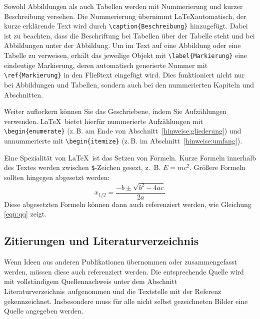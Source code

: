 \documentclass[final,bibliography=totocnumbered]{include/sikseminar}
\begin{document}
Sowohl Abbildungen als auch Tabellen werden mit Nummerierung und kurzer Beschreibung versehen. Die Nummerierung übernimmt \LaTeX automatisch, der kurze erklärende Text wird durch \verb+\caption{Beschreibung}+ hinzugefügt. Dabei ist zu beachten, dass die Beschriftung bei Tabellen über der Tabelle steht und bei Abbildungen unter der Abbildung. Um im Text auf eine Abbildung oder eine Tabelle zu verweisen, erhält das jeweilige Objekt mit \verb+\label{Markierung}+ eine eindeutige Markierung, deren automatisch generierte Nummer mit \verb+\ref{Markierung}+ in den Fließtext eingefügt wird. Dies funktioniert nicht nur bei Abbildungen und Tabellen, sondern auch bei den nummerierten Kapiteln und Abschnitten.

Weiter auflockern können Sie das Geschriebene, indem Sie Aufzählungen verwenden. \LaTeX\ bietet hierfür nummerierte Aufzählungen mit \verb+\begin{enumerate}+ (z.\,B. am Ende von Abschnitt~\ref{hinweise:gliederung}) und unnummerierte mit \verb+\begin{itemize}+ (z.\,B. im Abschnitt~\ref{hinweise:umfang}).

Eine Spezialität von \LaTeX\ ist das Setzen von Formeln. Kurze Formeln innerhalb des Textes werden zwischen \verb+$+-Zeichen gesezt, z.~B. $E=mc^2$. Größere Formeln sollten hingegen abgesetzt werden:
\begin{equation}
x_{1/2} = \frac{-b \pm \sqrt{b^2-4ac}}{2a}
\label{eqn:qq}
\end{equation}
Diese abgesetzten Formeln können dann auch referenziert werden, wie Gleichung \ref{eqn:qq} zeigt.


\subsection{Zitierungen und Literaturverzeichnis}

Wenn Ideen aus anderen Publikationen übernommen oder zusammengefasst werden, müssen diese auch referenziert werden. Die entsprechende Quelle wird mit vollständigem Quellennachweis unter dem Abschnitt \glqq Literaturverzeichnis\grqq\ aufgenommen und die Textstelle mit der Referenz gekennzeichnet. Insbesondere muss für alle nicht selbst gezeichneten Bilder eine Quelle angegeben werden.
\end{document}
